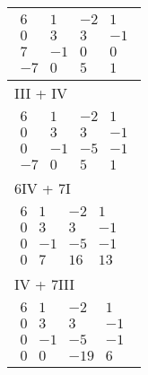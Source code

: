 \begin{longtable}{p{10cm}}
    $\displaystyle\begin{matrix}
                          6  & 1  & -2 & 1  \\
                          0  & 3  & 3  & -1 \\
                          7  & -1 & 0  & 0  \\
                          -7 & 0  & 5  & 1
                      \end{matrix}$                                                        \\\hline
    III + IV                                                                               \\\hline\pagebreak[0]
    $\displaystyle\begin{matrix}
                          6  & 1  & -2 & 1  \\
                          0  & 3  & 3  & -1 \\
                          0  & -1 & -5 & -1 \\
                          -7 & 0  & 5  & 1
                      \end{matrix}$                                                        \\\hline
    6IV + 7I                                                                               \\\hline\pagebreak[0]
    $\displaystyle\begin{matrix}
                          6 & 1  & -2 & 1  \\
                          0 & 3  & 3  & -1 \\
                          0 & -1 & -5 & -1 \\
                          0 & 7  & 16 & 13
                      \end{matrix}$                                                         \\\hline
    IV + 7III                                                                              \\\hline\pagebreak[0]
    $\displaystyle\begin{matrix}
                          6 & 1  & -2  & 1  \\
                          0 & 3  & 3   & -1 \\
                          0 & -1 & -5  & -1 \\
                          0 & 0  & -19 & 6
                      \end{matrix}$                                                        \\\hline

\end{longtable}
